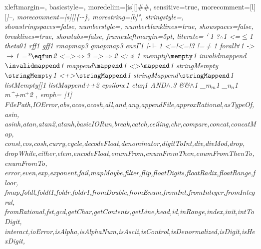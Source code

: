  {
    xleftmargin=\parindent,
	basicstyle=\ttfamily\codesize,
	moredelim=[is][\showfocus]{\#}{\#},
	sensitive=true,
	morecomment=[l][\color{gray_ulisses}\ttfamily\itshape\codesize]{--},
	morecomment=[s][\color{gray_ulisses}\ttfamily\itshape\codesize]{\{-}{-\}},
	morestring=[b]",
	stringstyle=\color{haskellstr},
	showstringspaces=false,
	numberstyle=\codesize,
	numberblanklines=true,
	showspaces=false,
	breaklines=true,
	showtabs=false,
    framexleftmargin=5pt,
    literate={
           {`}{{{$^{\backprime}{}$}}}1
           {?}{{{$\therefore$}}}1
           {<=}{{$\leq$}}1
           {theta}{{$\theta$}}1
           {rf}{{{\color{lappcolor}f}}}1
           {gf}{{{\color{lappascolor}f}}}1
           {rmap}{{{\color{lappcolor}map}}}3
           {gmap}{{{\color{lappascolor}map}}}3
           {env}{{$\Gamma$}}1
           {|-}{{$\vdash$}}1
           {<=!}{{{\color{lcolor}<=!}}}3
           {!=}{{$\neq$}}1
           {forall}{{$\forall$}}1
           {->}{{$\rightarrow$}}1
           {=*}{{$\eqfun$}}2
           {<=>}{{$\Leftrightarrow$}}3
           {=>}{{$\Rightarrow$}}2
           {<:}{{$\preceq$}}1
           {mempty}{{$\mempty$}}1
           {invalidmappend}{{$\invalidmappend$}}1
           {mappend}{{$\mappend$}}1
           {<>}{{$\mappend$}}1
           {stringMempty}{{$\stringMempty$}}1
           {<+>}{{$\stringMappend$}}1
           {stringMappend}{{$\stringMappend$}}1
           {listMempty}{{[]}}1
           {listMappend}{{++}}2
           {epsilon}{{$\epsilon$}}1
           {eta}{{$\eta$}}1
           {AND}{$\land$.}3
           {&&}{{$\land$}}1
           {_m}{{${}_m$}}1
           {_n}{{${}_n$}}1
           {m^+}{{m${}^{+}$}}2
           },
	emph=
	{[1]
		FilePath,IOError,abs,acos,acosh,all,and,any,appendFile,approxRational,asTypeOf,asin,
		asinh,atan,atan2,atanh,basicIORun,break,catch,ceiling,chr,compare,concat,concatMap,
		const,cos,cosh,curry,cycle,decodeFloat,denominator,digitToInt,div,divMod,drop,
		dropWhile,either,elem,encodeFloat,enumFrom,enumFromThen,enumFromThenTo,enumFromTo,
		error,even,exp,exponent,fail,mapMaybe,filter,flip,floatDigits,floatRadix,floatRange,floor,
		fmap,foldl,foldl1,foldr,foldr1,fromDouble,fromEnum,fromInt,fromInteger,fromIntegral,
		fromRational,fst,gcd,getChar,getContents,getLine,head,id,inRange,index,init,intToDigit,
		interact,ioError,isAlpha,isAlphaNum,isAscii,isControl,isDenormalized,isDigit,isHexDigit,
}}
